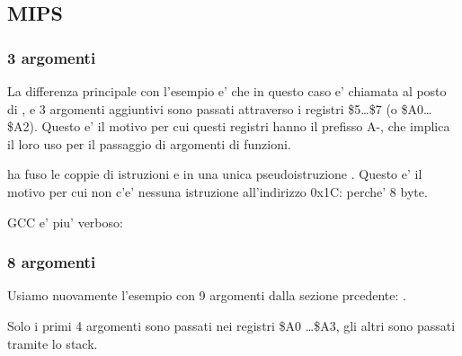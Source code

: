 \subsection{MIPS}

\subsubsection{3 argomenti}


La differenza principale con l'esempio \q{\HelloWorldSectionName} e' che in questo caso \printf e' chiamata 
al posto di \puts, e 3 argomenti aggiuntivi sono passati attraverso i registri \$5\dots \$7 (o \$A0\dots \$A2).
Questo e' il motivo per cui questi registri hanno il prefisso A-, che implica il loro uso per il passaggio di argomenti di funzioni.





\IDA ha fuso le coppie di istruzioni  e  in una unica pseudoistruzione .
Questo e' il motivo per cui non c'e' nessuna istruzione all'indirizzo 0x1C: perche'   8 byte.%


\NonOptimizing GCC e' piu' verboso:





\subsubsection{8 argomenti}

Usiamo nuovamente l'esempio con 9 argomenti dalla sezione prcedente: .




Solo i primi 4 argomenti sono passati nei registri \$A0 \dots \$A3, gli altri sono passati tramite lo stack.

